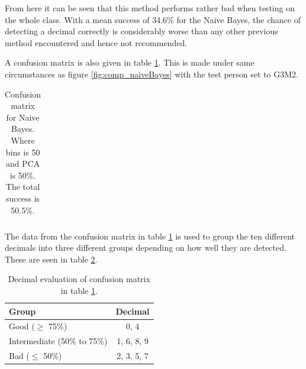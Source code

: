 From here it can be seen that this method performs rather bad when testing on the whole class.
With a mean success of 34.6\% for the Naive Bayes, the chance of detecting a decimal correctly is considerably worse than any other previous method  encountered and hence not recommended.

A confusion matrix is also given in table \ref{tb:confus_bayes}.
This is made under same circumstances as figure \ref{fig:comp_naiveBayes} with the test person set to G3M2.

\begin{table}[H]
\centering
	\begin{subtable}{0.75\textwidth}
        \centering
    \end{subtable}
    
    \begin{subtable}{0.05\textwidth}
        \flushright
    \end{subtable}
    \begin{subtable}{0.7\textwidth}
            \centering
                \begin{tabular}{l|*{10}{c}}
                    
                \end{tabular}
    \end{subtable}
    \caption{Confusion matrix for Naive Bayes.
    Where bins is 50 and PCA is 50\%. The total success is 50.5\%.}
    \label{tb:confus_bayes}
\end{table}

The data from the confusion matrix in table \ref{tb:confus_bayes} is used to group the ten different decimals into three different groups depending on how well they are detected.
These are seen in table \ref{tab:dec_eval_confus}.

\begin{table}[H]
\centering
\begin{tabular}{|l|c|}
\hline
Group & Decimal \\ \hline
Good ($\geq$ 75\%) & 0, 4 \\ \hline
Intermediate (50\% to 75\%) & 1, 6, 8, 9 \\ \hline
Bad ($\leq$ 50\%) & 2, 3, 5, 7 \\ \hline
\end{tabular}
\caption{Decimal evaluation of confusion matrix in table \ref{tb:confus_bayes}.}
\label{tab:dec_eval_confus}
\end{table}

